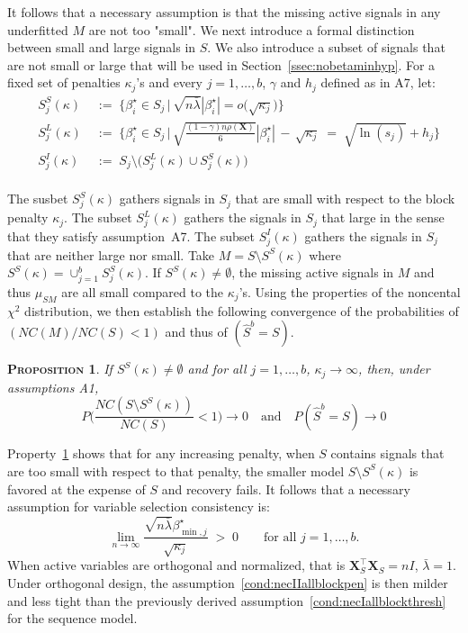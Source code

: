 \documentclass[aos]{imsart}
\theoremstyle{plain}
\newtheorem{prop}[thm]{\textsc{Proposition}}
\newcommand{\bs}{\boldsymbol}
\begin{document}
It follows that a necessary assumption is that the missing active signals in any underfitted $M$ are not too "small". We next introduce a formal distinction between small and large signals in $S$. We also introduce a subset of signals that are not small or large that will be used in Section~\ref{ssec:nobetaminhyp}.  For a fixed set of penalties $\kappa_j$'s and every $j=1,\ldots,b$, $\gamma$ and $h_j$ defined as in A7, let: 
\begin{eqnarray}
    &S_j^{S}(\kappa)\;&:=\;\Bigg\{\beta_i^{\star} \in S_j \,\Big|\,\sqrt{n\bar{\lambda}}|\beta_{i}^{\star}|=o\big(\sqrt{\kappa_j}\big) \Bigg\}\nonumber\\
    &S_j^{L}(\kappa)\;&:=\;\Bigg\{\beta_i^{\star} \in S_j \,\Big|\,\sqrt{\frac{(1-\gamma) n\rho(\bs X)}{6}}|\beta_{i}^{\star}| \,- \,\sqrt{\kappa_j} \;=\; \sqrt{\ln(s_j)} + h_j\Bigg\}\label{eq:defslsi}\\
    &S_j^{I}(\kappa)\;&:=\;S_j \setminus \big(S_j^{L}(\kappa) \cup S_j^{S}(\kappa)\big)\nonumber 
\end{eqnarray} \\
The susbet $S_j^{S}(\kappa)$ gathers signals in $S_j$ that are small with respect to the block penalty $\kappa_j$. The subset $S_j^{L}(\kappa)$ gathers the signals in $S_j$ that large in the sense that they satisfy assumption~A7. The subset $S_j^{I}(\kappa)$ gathers the signals in $S_j$ that are neither large nor small. Take $M=S\setminus S^{S}(\kappa)$ where $S^{S}(\kappa)=\cup_{j=1}^b S_j^{S}(\kappa)$. If $S^{S}(\kappa)\neq \emptyset$, the missing active signals in $M$ and thus $\mu_{SM}$ are all small compared to the $\kappa_j$'s. Using the properties of the noncental $\chi^2$ distribution, we then establish the following convergence of the probabilities of $(NC(M)/NC(S)<1)$ and thus of $(\hat{S}^{b}=S)$.

\begin{prop}\label{prop:nectypeIIreg}
    If $S^{S}(\kappa)\neq\emptyset$ and for all $j=1,\ldots,b$, $\kappa_j\to \infty$, then, under assumptions A1,
    $$P\Big(\frac{NC(S\setminus S^{S}(\kappa))}{NC(S)}<1\Big) \to 0 \quad\text{and}\quad P(\hat{S}^b=S)\to 0$$
\end{prop}
Property~\ref{prop:nectypeIIreg} shows that for any increasing penalty, when $S$ contains signals that are too small with respect to that penalty, the smaller model $S\setminus S^{S}(\kappa)$ is favored at the expense of $S$ and recovery fails. It follows that a necessary assumption for variable selection consistency is:
\begin{equation}\label{cond:necIIallblockpen}
\lim_{n\to\infty}\frac{\sqrt{n\bar{\lambda}}\beta_{\min,j}^{\star}}{\sqrt{\kappa_j}}\;>\;0\qquad\mbox{for all }j=1,\ldots,b.
\end{equation}
When active variables are orthogonal and normalized, that is $\bs X_S^{\top}\bs X_S = nI$, $\bar{\lambda}=1$. Under orthogonal design, the assumption~\eqref{cond:necIIallblockpen} is then milder and less tight than the previously derived assumption~\eqref{cond:necIallblockthresh} for the sequence model. 
\end{document}
